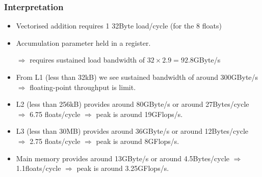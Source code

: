 \documentclass[presentation,aspectratio=43,10pt]{beamer}
\begin{document}
\begin{frame}
\begin{center}
  \end{center}
\end{frame}

\begin{frame}
  \frametitle{Interpretation}
  \begin{itemize}
  \item Vectorised addition requires 1 32Byte load/cycle (for the 8
    floats)
  \item Accumulation parameter held in a register.
  \item[$\Rightarrow$] requires sustained load bandwidth of $32\times
    2.9 = 92.8$GByte/s
  \item From L1 (less than 32kB) we see sustained bandwidth of around
    300GByte/s $\Rightarrow$ floating-point throughput is limit.
  \item L2 (less than 256kB) provides around 80GByte/s or around
    27Bytes/cycle $\Rightarrow$ 6.75 floats/cycle $\Rightarrow$ peak
    is around 19GFlops/s.
  \item L3 (less than 30MB) provides around 36GByte/s or around
    12Bytes/cycle $\Rightarrow$ 2.75 floats/cycle $\Rightarrow$ peak
    is around 8GFlops/s.
  \item Main memory provides around 13GByte/s or around 4.5Bytes/cycle
    $\Rightarrow$ 1.1floats/cycle $\Rightarrow$ peak is around 3.25GFlops/s.
  \end{itemize}
\end{frame}
\end{document}
